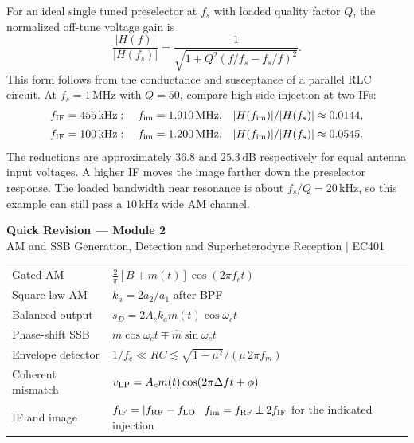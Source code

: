 \documentclass[12pt,a4paper]{article}
\renewcommand{\arraystretch}{1.45}
\begin{document}
\begin{tcolorbox}[examplebox, title={Calculate Image Rejection of a Single Tuned RF Stage}]
For an ideal single tuned preselector at $f_s$ with loaded quality factor $Q$, the normalized off-tune voltage gain is
\[
 \frac{|H(f)|}{|H(f_s)|}
 =\frac{1}{\sqrt{1+Q^2(f/f_s-f_s/f)^2}} .
\]
This form follows from the conductance and susceptance of a parallel RLC circuit. At $f_s=1\,\mathrm{MHz}$ with $Q=50$, compare high-side injection at two IFs:
\[
\begin{aligned}
 f_{\rm IF}=455\,\mathrm{kHz}:\quad f_{\rm im}&=1.910\,\mathrm{MHz},
 & |H(f_{\rm im})|/|H(f_s)|&\approx0.0144,\\[2pt]
 f_{\rm IF}=100\,\mathrm{kHz}:\quad f_{\rm im}&=1.200\,\mathrm{MHz},
 & |H(f_{\rm im})|/|H(f_s)|&\approx0.0545.
\end{aligned}
\]
The reductions are approximately $36.8$ and $25.3\,\mathrm{dB}$ respectively for equal antenna input voltages. A higher IF moves the image farther down the preselector response. The loaded bandwidth near resonance is about $f_s/Q=20\,\mathrm{kHz}$, so this example can still pass a $10\,\mathrm{kHz}$ wide AM channel.
\end{tcolorbox}

\newpage
\begin{center}
  {\large\bfseries\color{myred} Quick Revision --- Module 2}\\[3pt]
  {\small\color{mydark} AM and SSB Generation, Detection and Superheterodyne Reception $|$ EC401}
\end{center}
\noindent{\color{myred}\rule{\linewidth}{1.2pt}}
\par\vspace{4pt}

\begin{tcolorbox}[formulabox, title={Key Formulas at a Glance}]
\renewcommand{\arraystretch}{1.35}
\noindent\begin{tabularx}{\linewidth}{B{4.4cm} Y}
Gated AM & $\frac{2}{\pi}[B+m(t)]\cos(2\pi f_ct)$ \\[4pt]
Square-law AM & $k_a=2a_2/a_1$ after BPF \\[4pt]
Balanced output & $s_D=2A_ck_am(t)\cos\omega_ct$ \\[4pt]
Phase-shift SSB & $m\cos\omega_ct\mp\widehat m\sin\omega_ct$ \\[4pt]
Envelope detector & $1/f_c\ll RC\lesssim\sqrt{1-\mu^2}/(\mu\,2\pi f_m)$ \\[4pt]
Coherent mismatch & $v_{\rm LP}=A_cm(t)\cos(2\pi\Delta ft+\phi)$ \\[4pt]
IF and image & $f_{\rm IF}=|f_{\rm RF}-f_{\rm LO}|$ \newline $f_{\rm im}=f_{\rm RF}\pm2f_{\rm IF}$ for the indicated injection \\[4pt]
\end{tabularx}\par
\end{tcolorbox}
\end{document}
